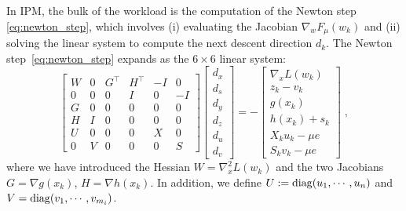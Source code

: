 In IPM, the bulk of the workload is the computation of the Newton
step \eqref{eq:newton_step}, which involves (i) evaluating the Jacobian
$\nabla_w F_\mu(w_k)$ and (ii) solving the linear system to compute
the next descent direction $d_k$.
The Newton step~\eqref{eq:newton_step} expands as the $6 \times 6$ linear system:
\begin{equation}
  \label{eq:kkt:unreduced}
  \tag{$K_3$}
  \begin{bmatrix}
    W & 0 & G^\top & H^\top & -I & 0 \\
    0 & 0 & 0 & I & 0 & -I \\
    G & 0 & 0 & 0 & 0 & 0 \\
    H & I & 0 & 0 & 0 & 0 \\
    U & 0 & 0 & 0 & X & 0 \\
    0 & V & 0 & 0 & 0 & S
  \end{bmatrix}
  \begin{bmatrix}
    d_x \\
    d_s \\
    d_y \\
    d_z \\
    d_u \\
    d_v
  \end{bmatrix}
  = - \begin{bmatrix}
    \nabla_x L(w_k) \\
       z_k - v_k  \\
       g(x_k)  \\
       h(x_k) + s_k  \\
       X_k u_k - \mu e  \\
       S_k v_k - \mu e
  \end{bmatrix} \; ,
\end{equation}
where we have introduced the Hessian $W = \nabla^2_x L(w_k)$ and
the two Jacobians $G = \nabla g(x_k)$, $H = \nabla h(x_k)$.
In addition, we define $U := \operatorname{diag}(u_1, \cdots, u_n)$
and $V = \operatorname{diag}(v_1, \cdots, v_{m_i})$.

